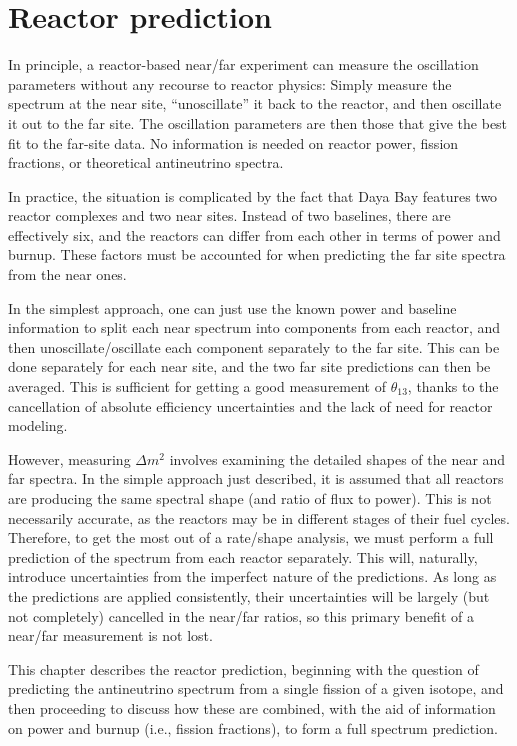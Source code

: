 \documentclass[../thesis.tex]{subfiles}
\begin{document}
\chapter{Reactor prediction}
\label{chap:reactor}


In principle, a reactor-based near/far experiment can measure the oscillation parameters without any recourse to reactor physics: Simply measure the spectrum at the near site, ``unoscillate'' it back to the reactor, and then oscillate it out to the far site. The oscillation parameters are then those that give the best fit to the far-site data. No information is needed on reactor power, fission fractions, or theoretical antineutrino spectra.

In practice, the situation is complicated by the fact that Daya Bay features two reactor complexes and two near sites. Instead of two baselines, there are effectively six, and the reactors can differ from each other in terms of power and burnup. These factors must be accounted for when predicting the far site spectra from the near ones.

In the simplest approach, one can just use the known power and baseline information to split each near spectrum into components from each reactor, and then unoscillate/oscillate each component separately to the far site. This can be done separately for each near site, and the two far site predictions can then be averaged. This is sufficient for getting a good measurement of $\theta_{13}$, thanks to the cancellation of absolute efficiency uncertainties and the lack of need for reactor modeling.

However, measuring $\Delta m^2$ involves examining the detailed shapes of the near and far spectra. In the simple approach just described, it is assumed that all reactors are producing the same spectral shape (and ratio of flux to power). This is not necessarily accurate, as the reactors may be in different stages of their fuel cycles. Therefore, to get the most out of a rate/shape analysis, we must perform a full prediction of the spectrum from each reactor separately. This will, naturally, introduce uncertainties from the imperfect nature of the predictions. As long as the predictions are applied consistently, their uncertainties will be largely (but not completely) cancelled in the near/far ratios, so this primary benefit of a near/far measurement is not lost.

This chapter describes the reactor prediction, beginning with the question of predicting the antineutrino spectrum from a single fission of a given isotope, and then proceeding to discuss how these are combined, with the aid of information on power and burnup (i.e., fission fractions), to form a full spectrum prediction.
\end{document}
